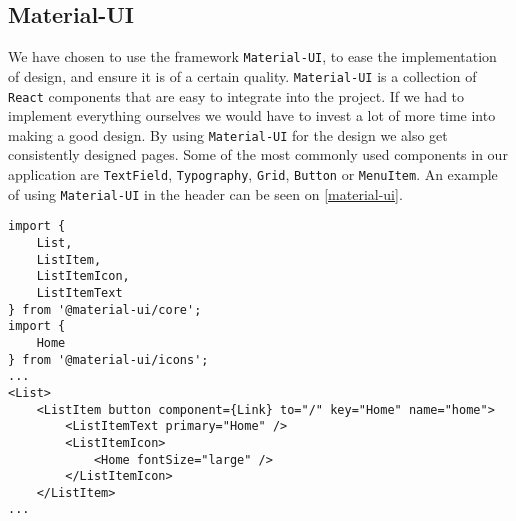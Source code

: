 \subsection{Material-UI}
We have chosen to use the framework \texttt{Material-UI}, to ease the implementation of design, and ensure it is of a certain quality.
\texttt{Material-UI} is a collection of \texttt{React} components that are easy to integrate into the project.
If we had to implement everything ourselves we would have to invest a lot of more time into making a good design.
By using \texttt{Material-UI} for the design we also get consistently designed pages.
Some of the most commonly used components in our application are \texttt{TextField}, \texttt{Typography}, \texttt{Grid}, \texttt{Button} or \texttt{MenuItem}.
An example of using \texttt{Material-UI} in the header can be seen on \autoref{material-ui}. 
\begin{lstlisting}[caption={Use of material-ui in the header}, captionpos=b, label={material-ui}]
import {
    List,
    ListItem,
    ListItemIcon,
    ListItemText
} from '@material-ui/core';
import {
	Home
} from '@material-ui/icons';
...
<List>
    <ListItem button component={Link} to="/" key="Home" name="home">
        <ListItemText primary="Home" />
        <ListItemIcon>
            <Home fontSize="large" />
        </ListItemIcon>
    </ListItem>
...
\end{lstlisting}

